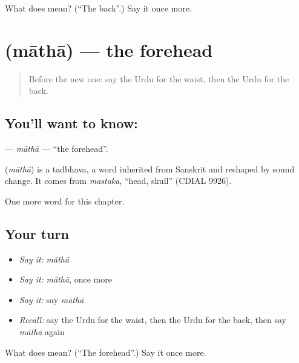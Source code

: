 \begin{tcolorbox}[breakable,colback=teal!4,colframe=teal!35!black,title={Before you move on}]
What does  mean? (\textquotedblleft{}The back\textquotedblright{}.) Say it once more.
\end{tcolorbox}
\section[\texorpdfstring{\ur{ماتھا} (māthā)}{ماتھا (māthā)}]{ (māthā) — the forehead}

\label{lesson:UR-C129-matha}



\begin{quote}
Before the new one: say the Urdu for the waist, then the Urdu for the back.
\end{quote}

\subsection*{You'll want to know: }
\textbf{} — \emph{māthā} — \textquotedblleft{}the forehead\textquotedblright{}.

\begin{cousinweb}
\textbf{} (\emph{māthā}) is a tadbhava, a word inherited from Sanskrit and reshaped by sound change. It comes from \emph{mastaka}, \textquotedblleft{}head, skull\textquotedblright{} (CDIAL 9926).
\end{cousinweb}

\begin{grammarlens}[title={What you've built}]
One more word for this chapter.
\end{grammarlens}

\subsection*{Your turn}
\begin{itemize}
\raggedright
  \item \emph{Say it:} \emph{māthā}
  \item \emph{Say it:} \emph{māthā}, once more
  \item \emph{Say it:} say \emph{māthā}
  \item \emph{Recall:} say the Urdu for the waist, then the Urdu for the back, then say \emph{māthā} again
\end{itemize}

\begin{tcolorbox}[breakable,colback=teal!4,colframe=teal!35!black,title={Before you move on}]
What does  mean? (\textquotedblleft{}The forehead\textquotedblright{}.) Say it once more.
\end{tcolorbox}
